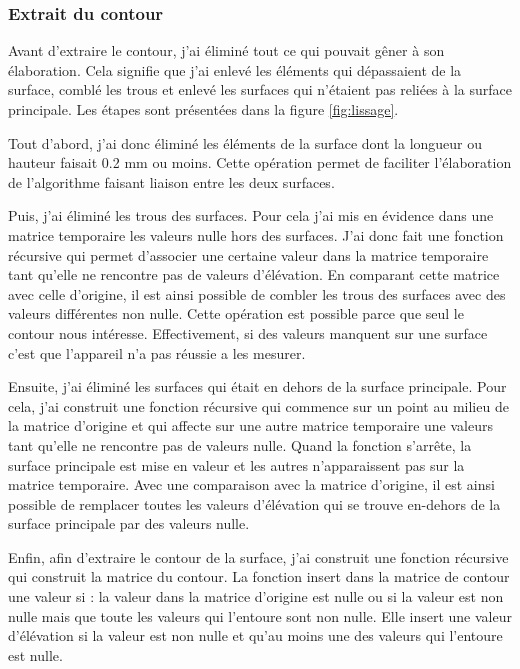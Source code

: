 \documentclass[a4paper,12pt]{article}
\begin{document}
		\subsubsection{Extrait du contour}
		Avant d'extraire le contour, j'ai éliminé tout ce qui pouvait g\^ener à son élaboration. Cela signifie que j'ai enlevé les éléments qui dépassaient de la surface, comblé les trous et enlevé les surfaces qui n'étaient pas reliées à la surface principale. Les étapes sont présentées dans la figure \ref{fig:lissage}. 
		
		Tout d'abord, j'ai donc éliminé les éléments de la surface dont la longueur ou hauteur faisait 0.2 mm ou moins. Cette opération permet de faciliter l'élaboration de l'algorithme faisant liaison entre les deux surfaces.
		
		Puis, j'ai éliminé les trous des surfaces. Pour cela j'ai mis en évidence dans une matrice temporaire les valeurs nulle hors des surfaces. J'ai donc fait une fonction récursive qui permet d'associer une certaine valeur dans la matrice temporaire tant qu'elle ne rencontre pas de valeurs d'élévation. En comparant cette matrice avec celle d'origine, il est ainsi possible de combler les trous des surfaces avec des valeurs différentes non nulle. Cette opération est possible parce que seul le contour nous intéresse. Effectivement, si des valeurs manquent sur une surface c'est que l'appareil n'a pas réussie a les mesurer.
		
		Ensuite, j'ai éliminé les surfaces qui était en dehors de la surface principale. Pour cela, j'ai construit une fonction récursive qui commence sur un point au milieu de la matrice d'origine et qui affecte sur une autre matrice temporaire une valeurs tant qu'elle ne rencontre pas de valeurs nulle. Quand la fonction s'arr\^ete, la surface principale est mise en valeur et les autres n'apparaissent pas sur la matrice temporaire. Avec une comparaison avec la matrice d'origine, il est ainsi possible de remplacer toutes les valeurs d'élévation qui se trouve en-dehors de la surface principale par des valeurs nulle.
		
		Enfin, afin d'extraire le contour de la surface, j'ai construit une fonction récursive qui construit la matrice du contour. La fonction insert dans la matrice de contour une valeur si : la valeur dans la matrice d'origine est nulle ou si la valeur est non nulle mais que toute les valeurs qui l'entoure sont non nulle. Elle insert une valeur d'élévation si la valeur est non nulle et qu'au moins une des valeurs qui l'entoure est nulle.
\end{document}
